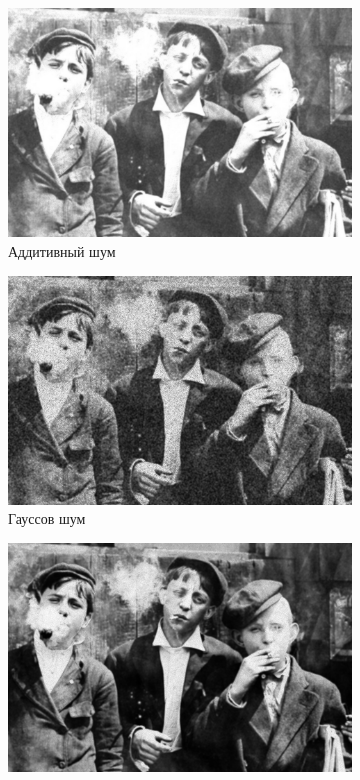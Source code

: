 \begin{figure}[ht]
\begin{subfigure}[b]{0.5\linewidth}
      \includegraphics[width=0.95\linewidth]{../Wiener_Filter/Wiener_Additive_noise_(k=5).jpg} 
      \caption{Аддитивный шум} 
      \label{weiner_5:c} 
      \vspace{4ex}
    \end{subfigure}%
    \begin{subfigure}[b]{0.5\linewidth}
      \centering
      \includegraphics[width=0.95\linewidth]{../Wiener_Filter/Wiener_Gaussian_noise_(k=5).jpg} 
      \caption{Гауссов шум} 
      \label{weiner_5:d} 
      \vspace{4ex}
    \end{subfigure}
    \begin{subfigure}[b]{0.5\linewidth}
      \centering
      \includegraphics[width=0.95\linewidth]{../Wiener_Filter/Wiener_Poisson_noise_(k=5).jpg} 

\end{subfigure}
\end{figure}

